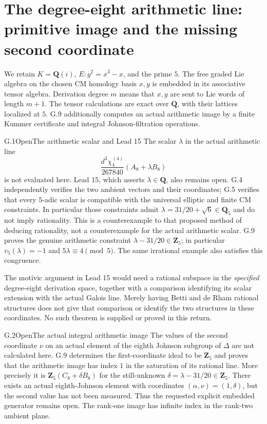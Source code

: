 \section{The degree-eight arithmetic line: primitive image and the missing second coordinate}

We retain $K=\mathbf Q(i)$, $E:y^2=x^3-x$, and the prime $5$.
The free graded Lie algebra on the chosen CM homology basis $x,y$
is embedded in its associative tensor algebra. Derivation degree $m$
means that $x,y$ are sent to Lie words of length $m+1$.
The tensor calculations are exact over $\mathbf Q$, with their
lattices localized at $5$. G.9 additionally computes an actual
arithmetic image by a finite Kummer certificate and integral
Johnson-filtration operations.

\begin{statement}{G.1}{Open}{The arithmetic scalar and Lead 15}
The scalar $\lambda$ in the actual arithmetic line
\[
 \frac{d^3\chi^{(4)}_4}{267840}(A_8+\lambda B_8)
\]
is not evaluated here. Lead 15, which asserts $\lambda\in\mathbf Q$,
also remains open. G.4 independently verifies the two ambient vectors
and their coordinates; G.5 verifies that every $5$-adic scalar is
compatible with the universal elliptic and finite CM constraints.
In particular those constraints admit
$\lambda=31/20+\sqrt6\in\mathbf Q_5$
and do not imply rationality. This is a counterexample to that proposed
method of deducing rationality, not a counterexample for the actual
arithmetic scalar.
G.9 proves the genuine arithmetic constraint
$\lambda-31/20\in\mathbf Z_5$; in particular
$v_5(\lambda)=-1$ and $5\lambda\equiv4\pmod5$.
The same irrational example also satisfies this congruence.

The motivic argument in Lead 15 would need a rational subspace in the
\emph{specified} degree-eight derivation space, together with a
comparison identifying its scalar extension with the actual Galois
line. Merely having Betti and de Rham rational structures does not
give that comparison or identify the two structures in these
coordinates. No such theorem is supplied or proved in this return.
\end{statement}

\begin{statement}{G.2}{Open}{The actual integral arithmetic image}
The values of the second coordinate $\nu$ on an actual element of
the eighth Johnson subgroup of $\Delta$ are not calculated here.
G.9 determines the first-coordinate ideal to be $\mathbf Z_5$ and
proves that the arithmetic image has index $1$ in the saturation
of its rational line. More precisely it is
$\mathbf Z_5(C_8+\delta B_8)$ for the still-unknown
$\delta=\lambda-31/20\in\mathbf Z_5$. There exists an actual
eighth-Johnson element with coordinates $(\alpha,\nu)=(1,\delta)$,
but the second value has not been measured. Thus the requested
explicit embedded generator remains open. The rank-one image
has infinite index in the rank-two ambient plane.
\end{statement}

